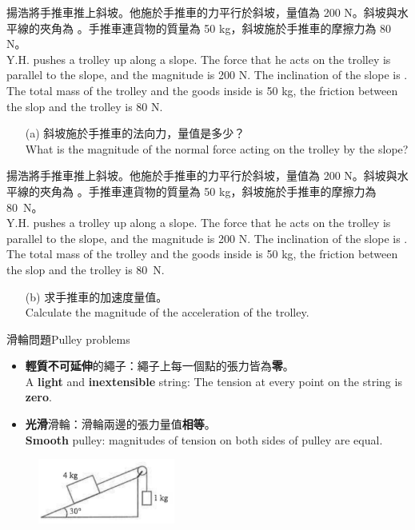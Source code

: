 \documentclass[beamer=true]{standalone}
\begin{document}
\begin{eg}
    揚浩將手推車推上斜坡。他施於手推車的力平行於斜坡，量值為 200 N。斜坡與水平線的夾角為 。手推車連貨物的質量為 50 kg，斜坡施於手推車的摩擦力為 80 N。\\Y.H. pushes a trolley up along a slope. The force that he acts on the trolley is parallel to the slope, and the magnitude is 200 N. The inclination of the slope is . The total mass of the trolley and the goods inside is 50 kg, the friction between the slop and the trolley is 80 N.

    \begin{itemize}
        \item[(a)] 斜坡施於手推車的法向力，量值是多少？\\What is the magnitude of the normal force acting on the trolley by the slope?
    \end{itemize}

\end{eg}
\begin{eg}
    揚浩將手推車推上斜坡。他施於手推車的力平行於斜坡，量值為 200 N。斜坡與水平線的夾角為 。手推車連貨物的質量為 50 kg，斜坡施於手推車的摩擦力為 \qty{80}{N}。\\Y.H. pushes a trolley up along a slope. The force that he acts on the trolley is parallel to the slope, and the magnitude is 200 N. The inclination of the slope is . The total mass of the trolley and the goods inside is 50 kg, the friction between the slop and the trolley is \qty{80}{N}.

    \begin{itemize}
        \item[(b)] 求手推車的加速度量值。\\Calculate the magnitude of the acceleration of the trolley.
    \end{itemize}
\end{eg}

\begin{frame}{滑輪問題Pulley problems}
    \begin{itemize}
        \item \textbf{輕質不可延伸}的繩子：繩子上每一個點的張力皆為\textbf{零}。\\A \textbf{light} and \textbf{inextensible} string: The tension at every point on the string is \textbf{zero}.
        \item \textbf{光滑}滑輪：滑輪兩邊的張力量值\textbf{相等}。\\\textbf{Smooth} pulley: magnitudes of tension on both sides of pulley are equal.
    \end{itemize}
    \begin{figure}[h!]
        \centering
        \includegraphics[width=0.4\textwidth]{assets/54dc796f.png}
    \end{figure}
\end{frame}
\end{document}
